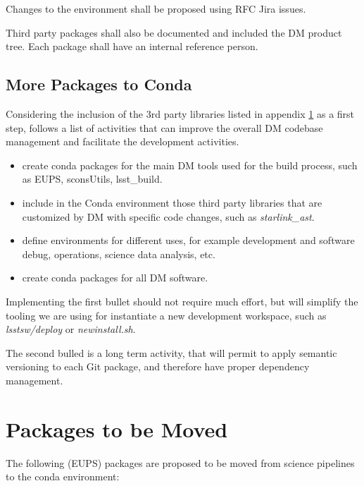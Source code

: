 Changes to the environment shall be proposed using RFC Jira issues.

Third party packages shall also be documented and included the DM product tree. 
Each package shall have an internal reference person.


\subsection{More Packages to Conda}

Considering the inclusion of the 3rd party libraries listed in appendix \ref{sec:tomove} as a first step, follows a list of activities that can improve the overall DM codebase management and facilitate the development activities.

\begin{itemize}
\item create conda packages for the main DM tools used for the build process, such as EUPS, sconsUtils, lsst\_build. 
\item include in the Conda environment those third party libraries that are customized by DM with specific code changes, such as \textit{starlink\_ast}.
\item define environments for different uses, for example development and software debug, operations, science data analysis, etc.
\item create conda packages for all DM software.
\end{itemize}

Implementing the first bullet should not require much effort, but will simplify the tooling we are using for instantiate a new development workspace, such as \textit{lsstsw/deploy} or \textit{newinstall.sh}.

The second bulled is a long term activity, that will permit to apply semantic versioning to each Git package, and therefore have proper dependency management.


\newpage
\appendix
\section{Packages to be Moved} \label{sec:tomove}

The following (EUPS) packages are proposed to be moved from science pipelines to the conda environment:

